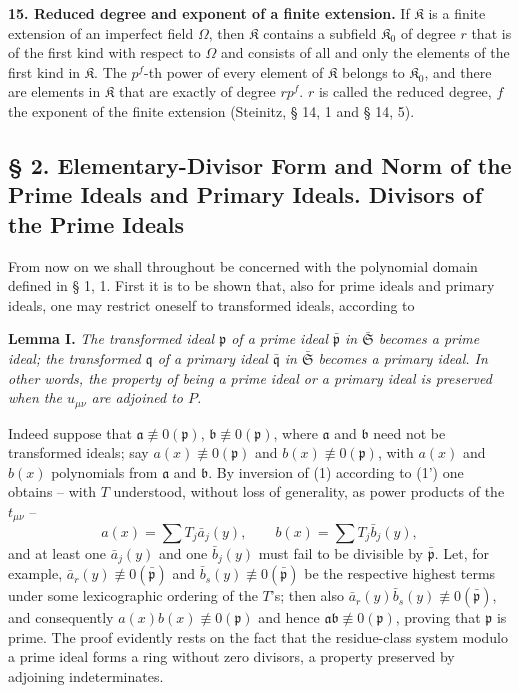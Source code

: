 \documentclass[11pt]{article}
\providecommand{\frakS}{\mathfrak S}
\providecommand{\frakp}{\mathfrak p}
\providecommand{\frakq}{\mathfrak q}
\providecommand{\fraka}{\mathfrak a}
\providecommand{\frakb}{\mathfrak b}
\providecommand{\frK}{\mathfrak K}
\providecommand{\frK}{\mathfrak K}
\providecommand{\fraka}{\mathfrak a}
\providecommand{\frakp}{\mathfrak p}
\providecommand{\frakp}{\mathfrak p}
\providecommand{\frakq}{\mathfrak q}
\providecommand{\frakS}{\mathfrak S}
\begin{document}
\textbf{15. Reduced degree and exponent of a finite extension.} If $\frK$ is a finite extension of an imperfect field $\Omega$, then $\frK$ contains a subfield $\frK_0$ of degree $r$ that is of the first kind with respect to $\Omega$ and consists of all and only the elements of the first kind in $\frK$. The $p^f$-th power of every element of $\frK$ belongs to $\frK_0$, and there are elements in $\frK$ that are exactly of degree $rp^f$. $r$ is called the reduced degree, $f$ the exponent of the finite extension (Steinitz, § 14, 1 and § 14, 5).

\subsection*{§ 2. Elementary-Divisor Form and Norm of the Prime Ideals and Primary Ideals. Divisors of the Prime Ideals}

From now on we shall throughout be concerned with the polynomial domain defined in § 1, 1. First it is to be shown that, also for prime ideals and primary ideals, one may restrict oneself to transformed ideals, according to

\textbf{Lemma I.} \emph{The transformed ideal $\frakp$ of a prime ideal $\bar{\frakp}$ in $\bar{\frakS}$ becomes a prime ideal; the transformed $\frakq$ of a primary ideal $\bar{\frakq}$ in $\bar{\frakS}$ becomes a primary ideal. In other words, the property of being a prime ideal or a primary ideal is preserved when the $u_{\mu\nu}$ are adjoined to $P$.}

Indeed suppose that $\fraka\not\equiv0(\frakp)$, $\frakb\not\equiv0(\frakp)$, where $\fraka$ and $\frakb$ need not be transformed ideals; say $a(x)\not\equiv0(\frakp)$ and $b(x)\not\equiv0(\frakp)$, with $a(x)$ and $b(x)$ polynomials from $\fraka$ and $\frakb$. By inversion of (1) according to (1') one obtains -- with $T$ understood, without loss of generality, as power products of the $t_{\mu\nu}$ --
\[
 a(x)=\sum T_j \bar a_j(y),\qquad b(x)=\sum T_j \bar b_j(y),
\]
and at least one $\bar a_j(y)$ and one $\bar b_j(y)$ must fail to be divisible by $\bar{\frakp}$. Let, for example, $\bar a_r(y)\not\equiv0(\bar{\frakp})$ and $\bar b_s(y)\not\equiv0(\bar{\frakp})$ be the respective highest terms under some lexicographic ordering of the $T$'s; then also $\bar a_r(y)\bar b_s(y)\not\equiv0(\bar{\frakp})$, and consequently $a(x)b(x)\not\equiv0(\frakp)$ and hence $\fraka\frakb\not\equiv0(\frakp)$, proving that $\frakp$ is prime. The proof evidently rests on the fact that the residue-class system modulo a prime ideal forms a ring without zero divisors, a property preserved by adjoining indeterminates.
\end{document}
